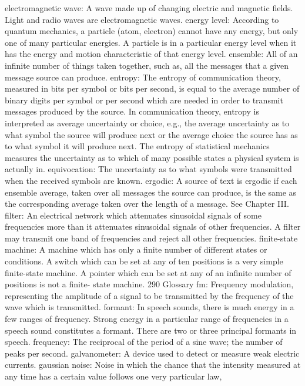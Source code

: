 {{{{{{{{{{{{{{{electromagnetic wave: A wave made up of changing electric and magnetic
fields. Light and radio waves are electromagnetic waves.
energy level: According to quantum mechanics, a particle (atom,
electron) cannot have any energy, but only one of many particular
energies. A particle is in a particular energy level when it has the
energy and motion characteristic of that energy level.
ensemble: All of an infinite number of things taken together, such as, all
the messages that a given message source can produce.
entropy: The entropy of communication theory, measured in bits per
symbol or bits per second, is equal to the average number of binary
digits per symbol or per second which are needed in order to
transmit messages produced by the source. In communication
theory, entropy is interpreted as average uncertainty or choice, e.g.,
the average uncertainty as to what symbol the source will produce
next or the average choice the source has as to what symbol it will
produce next. The entropy of statistical mechanics measures the
uncertainty as to which of many possible states a physical system is
actually in.
equivocation: The uncertainty as to what symbols were transmitted when
the received symbols are known.
ergodic: A source of text is ergodic if each ensemble average, taken over
all messages the source can produce, is the same as the corresponding
average taken over the length of a message. See Chapter III.
filter: An electrical network which attenuates sinusoidal signals of some
frequencies more than it attenuates sinusoidal signals of other
frequencies. A filter may transmit one band of frequencies and
reject all other frequencies.
finite-state machine: A machine which has only a finite number of
different states or conditions. A switch which can be set at any of
ten positions is a very simple finite-state machine. A pointer which
can be set at any of an infinite number of positions is not a finite-
state machine.
290 Glossary
fm: Frequency modulation, representing the amplitude of a signal to be
transmitted by the frequency of the wave which is transmitted.
formant: In speech sounds, there is much energy in a few ranges of
frequency. Strong energy in a particular range of frequencies in a
speech sound constitutes a formant. There are two or three principal
formants in speech.
frequency: The reciprocal of the period of a sine wave; the number of
peaks per second.
galvanometer: A device used to detect or measure weak electric currents.
gaussian noise: Noise in which the chance that the intensity measured
at any time has a certain value follows one very particular law,
}}}}}}}}}}}}}}}
